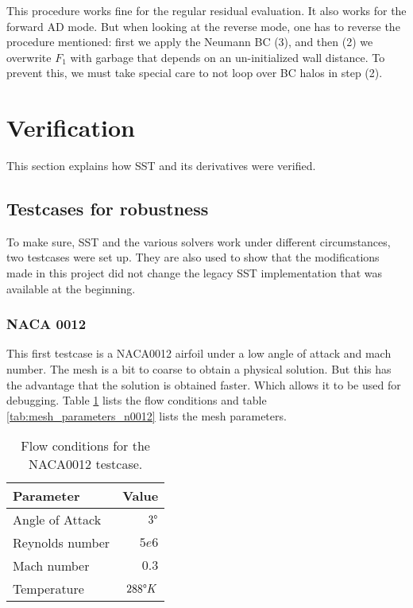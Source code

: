 \noindent This procedure works fine for the regular residual evaluation. It
also works for the forward AD mode. But when looking at the reverse mode, one
has to reverse the procedure mentioned: first we apply the Neumann BC (3), and
then (2) we overwrite $F_1$ with garbage that depends on an un-initialized wall
distance. To prevent this, we must take special care to not loop over BC halos
in step (2).








\section{Verification}
This section explains how SST and its derivatives were verified.




\subsection{Testcases for robustness}
To make sure, SST and the various solvers work under different circumstances,
two testcases were set up. They are also used to show that the
modifications made in this project did not change the legacy SST implementation
that was available at the beginning.


\subsubsection{NACA 0012}
This first testcase is a NACA0012 airfoil under a low angle of attack and mach
number. The mesh is a bit to coarse to obtain a physical solution. But this has
the advantage that the solution is obtained faster. Which allows it to be used
for debugging. Table \ref{tab:flow_conditions_n0012} lists the flow conditions
and table \ref{tab:mesh_parameters_n0012} lists the mesh parameters.

\begin{table}[H]
    \centering
    \begin{tabular}{l r}
        \toprule
        Parameter                           & Value \\
        \midrule
        Angle of Attack                     & $3 \degree$ \\
        Reynolds number                     & $5e6$ \\
        Mach number                         & $0.3$ \\
        Temperature                         & $288 \degree K$\\
        \bottomrule
    \end{tabular}
    \caption{Flow conditions for the NACA0012 testcase.}
    \label{tab:flow_conditions_n0012}
\end{table}

